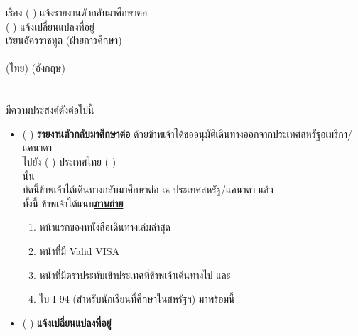 \documentclass[a4paper,13pt]{article}
\begin{document}
\noindent
เรื่อง ( ) แจ้งรายงานตัวกลับมาศึกษาต่อ \\
\phantom{เรื่อง }( ) แจ้งเปลี่ยนแปลงที่อยู่ \\
เรียน\hspace{10pt}อัครราชทูต (ฝ่ายการศึกษา) \\
\indent{}  \\
\indent\hspace{1.6in} (ไทย) \hspace{1.4in} (อังกฤษ) \\
  \\
  \\
มีความประสงค์ดังต่อไปนี้
\begin{itemize}[label={}]
  \item ( ) \textbf{\textbf{รายงานตัวกลับมาศึกษาต่อ}} ด้วยข้าพเจ้าได้ขออนุมัติเดินทางออกจากประเทศสหรัฐอเมริกา/แคนาดา \\
  \indent\hspace{0.6in}ไปยัง ( ) ประเทศไทย ( )  \\
  \indent\hspace{0.6in}  นั้น \\
  \indent\hspace{0.6in}บัดนี้ข้าพเจ้าได้เดินทางกลับมาศึกษาต่อ ณ ประเทศสหรัฐ/แคนาดา แล้ว  \\
  \indent\hspace{0.6in}ทั้งนี้ ข้าพเจ้าได้แนบ\textbf{\underline{ภาพถ่าย}}
  \begin{enumerate}
    \setlength{\itemindent}{0.5in}
    \item หน้าแรกของหนังสือเดินทางเล่มล่าสุด
    \item หน้าที่มี Valid VISA
    \item หน้าที่มีตราประทับเข้าประเทศที่ข้าพเจ้าเดินทางไป และ
    \item ใบ I-94 (สำหรับนักเรียนที่ศึกษาในสหรัฐฯ) มาพร้อมนี้
  \end{enumerate}
  \item ( ) \textbf{\textbf{แจ้งเปลี่ยนแปลงที่อยู่}}
\end{itemize}
\end{document}
